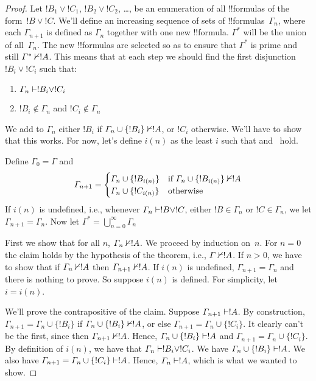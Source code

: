 \documentclass[../../../include/open-logic-section]{subfiles}
\begin{document}
\begin{proof}
  Let $!B_1 \lor !C_1$, $!B_2 \lor !C_2$, \dots, be an enumeration of
  all !!{formula}s of the form~$!B \lor !C$.  We'll define an
  increasing sequence of sets of !!{formula}s~$\Gamma_n$, where each
  $\Gamma_{n+1}$ is defined as $\Gamma_n$ together with one new
  !!{formula}. $\Gamma^*$ will be the union of all~$\Gamma_n$. The new
  !!{formula}s are selected so as to ensure that $\Gamma^*$ is prime
  and still $\Gamma^* \Proves/ !A$. This means that at each step we
  should find the first disjunction~$!B_i \lor !C_i$ such that:
  \begin{enumerate}
  \item{} $\Gamma_n \Proves !B_i \lor !C_i$
  \item{} $!B_i \notin \Gamma_n$ and $!C_i \notin \Gamma_n$
  \end{enumerate}
  We add to $\Gamma_n$ either $!B_i$ if $\Gamma_n \cup \{!B_i\}
  \Proves/ !A$, or $!C_i$ otherwise. We'll have to show that this
  works. For now, let's define $i(n)$ as the least $i$ such that
   and~ hold.
  
  Define $\Gamma_0 = \Gamma$ and
  \[
  \Gamma_{n+1} = \begin{cases}
    \Gamma_n \cup \{!B_{i(n)}\} &
    \text{if $\Gamma_n \cup \{!B_{i(n)}\} \Proves/ !A$} \\
    \Gamma_n \cup \{!C_{i(n)}\} & \text{otherwise}
    \end{cases}
  \]
  If $i(n)$ is undefined, i.e., whenever $\Gamma_n \Proves !B \lor !C$,
  either $!B \in \Gamma_n$ or $!C \in \Gamma_n$, we let $\Gamma_{n+1}
  = \Gamma_n$.  Now let $\Gamma^* = \bigcup_{n=0}^\infty \Gamma_n$

  First we show that for all $n$, $\Gamma_n \Proves/ !A$. We proceed
  by induction on~$n$. For $n = 0$ the claim holds by the hypothesis
  of the theorem, i.e., $\Gamma \Proves/ !A$. If $n>0$, we have to
  show that if $\Gamma_n \Proves/ !A$ then $\Gamma_{n+1} \Proves/ !A$. If
  $i(n)$ is undefined, $\Gamma_{n+1} = \Gamma_n$ and there is nothing
  to prove. So suppose $i(n)$ is defined. For simplicity, let $i =
  i(n)$.
  
  We'll prove the contrapositive of the claim. Suppose $\Gamma_{n+1}
  \Proves !A$. By construction, $\Gamma_{n+1} = \Gamma_n \cup
  \{!B_i\}$ if $\Gamma_n \cup \{!B_i\} \Proves/ !A$, or else
  $\Gamma_{n+1} = \Gamma_n \cup \{!C_i\}$. It clearly can't be the
  first, since then $\Gamma_{n+1} \Proves/ !A$.  Hence, $\Gamma_n \cup
  \{!B_i\} \Proves !A$ and $\Gamma_{n+1} = \Gamma_n \cup \{!C_i\}$.
  By definition of $i(n)$, we have that $\Gamma _n \Proves !B_i \lor
  !C_i$. We have $\Gamma_n \cup \{!B_i\} \Proves !A$. We also have
  $\Gamma_{n+1} = \Gamma_n \cup \{!C_i\} \Proves !A$. Hence, $\Gamma_n
  \Proves !A$, which is what we wanted to show.


\end{proof}
\end{document}
